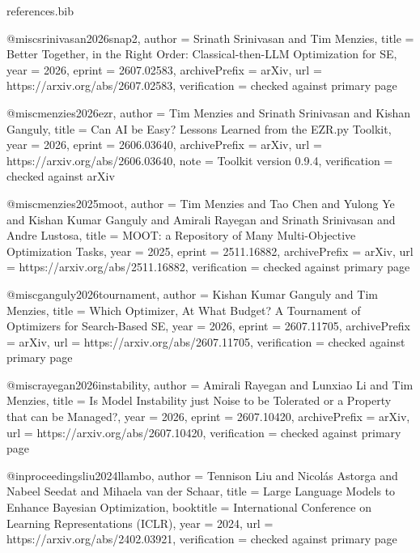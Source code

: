 \begin{filecontents*}[overwrite]{references.bib}

@misc{srinivasan2026snap2,
  author = {Srinath Srinivasan and Tim Menzies},
  title = {Better Together, in the Right Order: Classical-then-{LLM} Optimization for {SE}},
  year = {2026},
  eprint = {2607.02583},
  archivePrefix = {arXiv},
  url = {https://arxiv.org/abs/2607.02583},
  verification = {checked against primary page}
}

@misc{menzies2026ezr,
  author = {Tim Menzies and Srinath Srinivasan and Kishan Ganguly},
  title = {Can {AI} be Easy? {L}essons Learned from the {EZR.py} Toolkit},
  year = {2026},
  eprint = {2606.03640},
  archivePrefix = {arXiv},
  url = {https://arxiv.org/abs/2606.03640},
  note = {Toolkit version 0.9.4},
  verification = {checked against arXiv}
}
 
@misc{menzies2025moot,
  author = {Tim Menzies and Tao Chen and Yulong Ye and Kishan Kumar Ganguly and Amirali Rayegan and Srinath Srinivasan and Andre Lustosa},
  title = {{MOOT}: a Repository of Many Multi-Objective Optimization Tasks},
  year = {2025},
  eprint = {2511.16882},
  archivePrefix = {arXiv},
  url = {https://arxiv.org/abs/2511.16882},
  verification = {checked against primary page}
}

@misc{ganguly2026tournament,
  author = {Kishan Kumar Ganguly and Tim Menzies},
  title = {Which Optimizer, At What Budget? {A} Tournament of Optimizers for Search-Based {SE}},
  year = {2026},
  eprint = {2607.11705},
  archivePrefix = {arXiv},
  url = {https://arxiv.org/abs/2607.11705},
  verification = {checked against primary page}
}

@misc{rayegan2026instability,
  author = {Amirali Rayegan and Lunxiao Li and Tim Menzies},
  title = {Is Model Instability just Noise to be Tolerated or a Property that can be Managed?},
  year = {2026},
  eprint = {2607.10420},
  archivePrefix = {arXiv},
  url = {https://arxiv.org/abs/2607.10420},
  verification = {checked against primary page}
}

@inproceedings{liu2024llambo,
  author = {Tennison Liu and Nicol{\'a}s Astorga and Nabeel Seedat and Mihaela van der Schaar},
  title = {Large Language Models to Enhance {B}ayesian Optimization},
  booktitle = {International Conference on Learning Representations (ICLR)},
  year = {2024},
  url = {https://arxiv.org/abs/2402.03921},
  verification = {checked against primary page}
}


\end{filecontents*}
